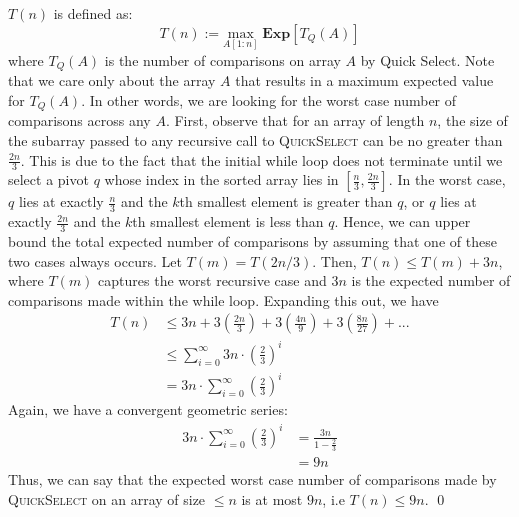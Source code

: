 \documentclass[12pt]{article}
\begin{document}
\begin{solution}
\begin{subprob}
        \item $T(n)$ is defined as:
        \[
        T(n) := \underset{A[1:n]}{\text{max}} \hspace{3pt }\textbf{Exp}[T_Q(A)]
        \]
        where $T_Q(A)$ is the number of comparisons on array $A$ by Quick Select. Note that we care only about the array $A$ that results in a maximum expected value for $T_Q(A)$. In other words, we are looking for the worst case number of comparisons across any $A$. First, observe that for an array of length $n$, the size of the subarray passed to any recursive call to \textsc{QuickSelect} can be no greater than $\frac{2n}{3}$. This is due to the fact that the initial while loop does not terminate until we select a pivot $q$ whose index in the sorted array lies in $[\frac{n}{3}, \frac{2n}{3}]$. In the worst case, $q$ lies at exactly $\frac{n}{3}$ and the $k$th smallest element is greater than $q$, or $q$ lies at exactly $\frac{2n}{3}$ and the $k$th smallest element is less than $q$. Hence, we can upper bound the total expected number of comparisons by assuming that one of these two cases always occurs. Let $T(m) = T(2n/3)$. Then, $T(n) \leq T(m) + 3n$, where $T(m)$ captures the worst recursive case and $3n$ is the expected number of comparisons made within the while loop. Expanding this out, we have
        \begin{align*}
        T(n) &\leq 3n + 3\left(\frac{2n}{3}\right) + 3\left(\frac{4n}{9}\right) + 3\left(\frac{8n}{27}\right) + ... \\
             &\leq \sum\limits_{i=0}^{\infty} 3n \cdot \left(\frac{2}{3}\right)^i \\
             &= 3n \cdot \sum\limits_{i=0}^{\infty} \left(\frac{2}{3}\right)^i
        \end{align*}
        Again, we have a convergent geometric series:
        \begin{align*}
            3n \cdot \sum\limits_{i=0}^{\infty}\left(\frac{2}{3}\right)^i &= \frac{3n}{1-\frac{2}{3}} \\
            &= 9n
        \end{align*}
        Thus, we can say that the expected worst case number of comparisons made by \textsc{QuickSelect} on an array of size $\leq n$ is at most $9n$, i.e $T(n) \leq 9n$. \qed
         
    \end{subprob}
\end{solution}
\end{document}
